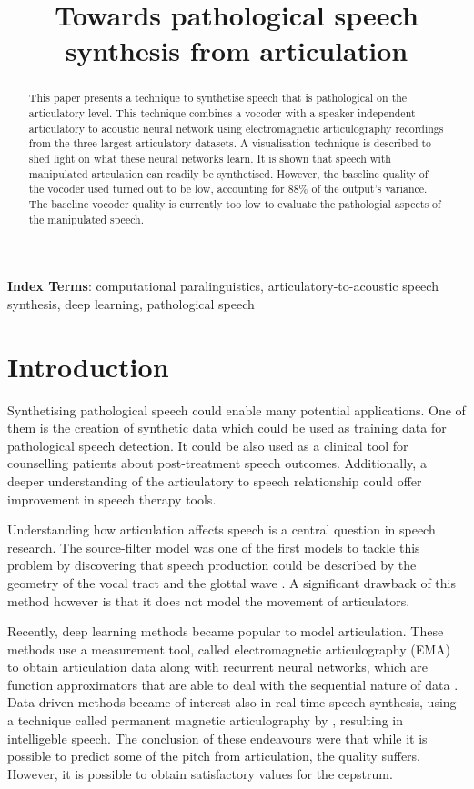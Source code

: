 \documentclass[a4paper]{article}
\title{Towards pathological speech synthesis from articulation}
\begin{document}
\maketitle
% 
\begin{abstract}
  This paper presents a technique to synthetise speech that is pathological on the articulatory level.
  This technique combines a vocoder with a speaker-independent articulatory to acoustic neural network using electromagnetic articulography recordings from the three largest articulatory datasets.
  A visualisation technique is described to shed light on what these neural networks learn.
  It is shown that speech with manipulated artculation can readily be synthetised.
  However, the baseline quality of the vocoder used turned out to be low, accounting for
  88\% of the output's variance. The baseline vocoder quality is currently too low to
  evaluate the pathologial aspects of the manipulated speech.
\end{abstract}
\noindent\textbf{Index Terms}: computational paralinguistics, articulatory-to-acoustic
speech synthesis, deep learning, pathological speech

\section{Introduction}

Synthetising pathological speech could enable many potential applications.
One of them is the creation of synthetic data which could be
used as training data for pathological speech detection. It could be also used as a
clinical tool for counselling patients about post-treatment speech outcomes. Additionally, a
deeper understanding of the articulatory to speech relationship could offer improvement
in speech therapy tools.

Understanding how articulation affects speech is a central question in speech
research. The source-filter model was one of the first models to tackle this
problem by discovering that speech production could be described by
the geometry of the vocal tract and the glottal wave \cite{Benesty2009} \cite{Fant1981}.
A significant drawback of this method however is that it does not model the movement of articulators.

Recently, deep learning methods became popular
to model articulation. These methods use a measurement tool,
called electromagnetic articulography (EMA) to obtain articulation data 
\cite{Aryal2016} \cite{Taguchi} \cite{Liu2018} along with recurrent
neural networks, which are function approximators that are able to deal with
the sequential nature of data \cite{Hochreiter1997}. Data-driven methods became of interest also
in real-time speech synthesis, using a technique called permanent magnetic articulography
by \cite{Gonzalez2017}, resulting in intelligeble
speech. The conclusion of these endeavours were that while it is possible to
predict some of the pitch from articulation, the quality suffers.
However, it is possible to obtain satisfactory values for the
cepstrum.
\end{document}
